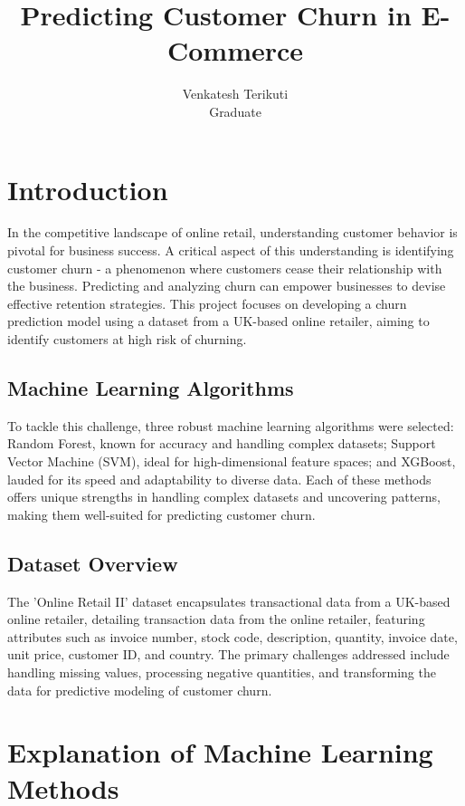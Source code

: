 \documentclass[12pt]{article}
\begin{document}
{\color{customblue}\title{Predicting Customer Churn in E-Commerce}}
\author{Venkatesh Terikuti \\ Graduate}
\maketitle


\section*{Introduction}
In the competitive landscape of online retail, understanding customer behavior is pivotal for business success. A critical aspect of this understanding is identifying customer churn - a phenomenon where customers cease their relationship with the business. Predicting and analyzing churn can empower businesses to devise effective retention strategies. This project focuses on developing a churn prediction model using a dataset from a UK-based online retailer, aiming to identify customers at high risk of churning.

\subsection*{Machine Learning Algorithms}
To tackle this challenge, three robust machine learning algorithms were selected: Random Forest, known for accuracy and handling complex datasets; Support Vector Machine (SVM), ideal for high-dimensional feature spaces; and XGBoost, lauded for its speed and adaptability to diverse data. Each of these methods offers unique strengths in handling complex datasets and uncovering patterns, making them well-suited for predicting customer churn.

\subsection*{Dataset Overview}
The 'Online Retail II' dataset encapsulates transactional data from a UK-based online retailer, detailing transaction data from the online retailer, featuring attributes such as invoice number, stock code, description, quantity, invoice date, unit price, customer ID, and country. The primary challenges addressed include handling missing values, processing negative quantities, and transforming the data for predictive modeling of customer churn.

\section*{Explanation of Machine Learning Methods}
\end{document}
